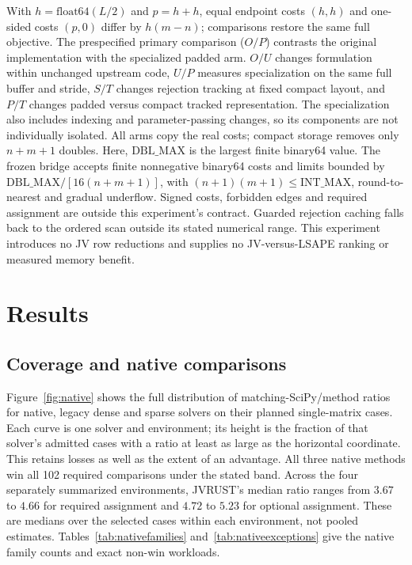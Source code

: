 \documentclass[11pt,a4paper]{article}
\begin{document}
With $h=\mathrm{float64}(L/2)$ and $p=h+h$, equal endpoint costs $(h,h)$ and one-sided costs $(p,0)$ differ by $h(m-n)$; comparisons restore the same full objective. The prespecified primary comparison ($O/P$) contrasts the original implementation with the specialized padded arm. $O/U$ changes formulation within unchanged upstream code, $U/P$ measures specialization on the same full buffer and stride, $S/T$ changes rejection tracking at fixed compact layout, and $P/T$ changes padded versus compact tracked representation. The specialization also includes indexing and parameter-passing changes, so its components are not individually isolated. All arms copy the real costs; compact storage removes only $n+m+1$ doubles. Here, $\mathrm{DBL\_MAX}$ is the largest finite binary64 value. The frozen bridge accepts finite nonnegative binary64 costs and limits bounded by $\mathrm{DBL\_MAX}/[16(n+m+1)]$, with $(n+1)(m+1)\leq\mathrm{INT\_MAX}$, round-to-nearest and gradual underflow. Signed costs, forbidden edges and required assignment are outside this experiment's contract. Guarded rejection caching falls back to the ordered scan outside its stated numerical range. This experiment introduces no JV row reductions and supplies no JV-versus-LSAPE ranking or measured memory benefit.

\FloatBarrier
\section{Results}\label{sec:results}

\FloatBarrier
\subsection{Coverage and native comparisons}

Figure~\ref{fig:native} shows the full distribution of matching-SciPy/method ratios for native, legacy dense and sparse solvers on their planned single-matrix cases. Each curve is one solver and environment; its height is the fraction of that solver's admitted cases with a ratio at least as large as the horizontal coordinate. This retains losses as well as the extent of an advantage. All three native methods win all 102 required comparisons under the stated band. Across the four separately summarized environments, JVRUST's median ratio ranges from $3.67$ to $4.66$ for required assignment and $4.72$ to $5.23$ for optional assignment. These are medians over the selected cases within each environment, not pooled estimates. Tables~\ref{tab:nativefamilies} and~\ref{tab:nativeexceptions} give the native family counts and exact non-win workloads.
\end{document}
